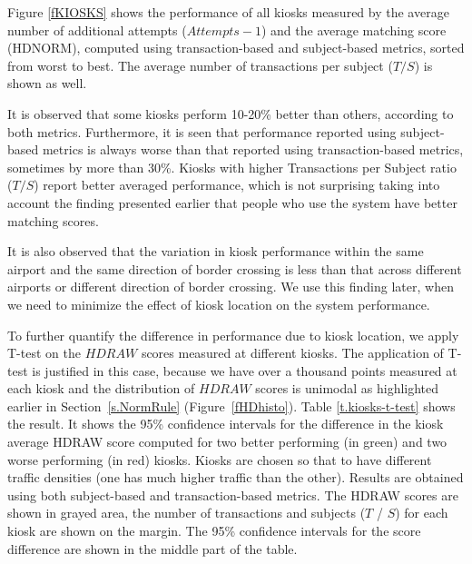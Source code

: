 \documentclass{cta-author}%
\begin{document}
Figure  \ref{fKIOSKS} 
shows the performance of all kiosks measured by the average number of additional attempts ($Attempts-1$) and the average matching score (HDNORM), computed using transaction-based and subject-based metrics, sorted from worst to best. The average number of transactions per subject ($T/S$) is shown as well.




It is  observed that 
some kiosks perform 10-20\% better than others, according to both 
metrics. 
Furthermore, it is seen that  performance reported using subject-based metrics is always worse than that reported using transaction-based metrics, sometimes by more than 30\%. 
Kiosks with higher Transactions per Subject ratio ($T/S$) report better averaged performance, 
which is not surprising taking into account the finding presented earlier that people who use the system  have better matching scores.


It is also observed that the variation in kiosk performance within the same airport and the same direction of border crossing  is less than that across different airports or different direction of border crossing. We use this finding later, when we need to minimize the effect of kiosk location on the system performance.

    
To  further quantify the difference in performance due to kiosk location, we apply T-test \cite{R-book} on the $HDRAW$ scores measured at different kiosks. The application of T-test is justified in this case, because we have over a thousand points measured at  each kiosk and the distribution of $HDRAW$ scores is unimodal as highlighted earlier in Section~\ref{s.NormRule} (Figure~\ref{fHDhisto}).
Table \ref{t.kiosks-t-test} shows the result. 
It shows 
the 95\% confidence intervals for the difference  in the kiosk average HDRAW score 
computed for 
two better performing (in green) and two worse performing (in red) kiosks. Kiosks are chosen so that to have different traffic densities (one has much higher traffic than the other). 
Results are obtained 
using both subject-based and transaction-based  metrics.
The HDRAW scores are shown in grayed area, the number of  transactions  and  subjects ($T$ / $S$) for each kiosk are shown on the margin. %
The  95\% confidence intervals for the score difference are shown in the middle part of  the table. 
\end{document}

